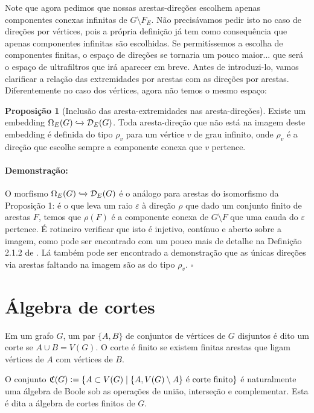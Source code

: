 \documentclass[11pt]{article}
\renewcommand{\textit}[1]{{\fakeitalic#1}}
\newcommand{\defeq}{\vcentcolon=}
\newcommand{\pulinho}{\vspace{.5cm}}
\theoremstyle{definition}
\theoremstyle{definition}
\theoremstyle{definition}
\newtheorem{prop}{Proposição}
\newenvironment{proposicao}{
\definecolor{shadecolor}{HTML}{FFDBDF}
\begin{shaded}
\begin{prop}
}
{
\end{prop}
\end{shaded}
}
\theoremstyle{definition}
\theoremstyle{definition}
\theoremstyle{definition}
\theoremstyle{definition}
\theoremstyle{definition}
\newtheorem*{definition*}{Definição}
\newenvironment{definicao*}{
\definecolor{shadecolor}{HTML}{defcfc}
\begin{shaded}
\begin{definition*}
}
{
\end{definition*}
\end{shaded}
}
\theoremstyle{definition}
\theoremstyle{definition}
\theoremstyle{definition}
\theoremstyle{definition}
\newenvironment{prova}{\paragraph{Demonstração:}}{\hfill$\square$ 
\pulinho
}
\begin{document}
Note que agora pedimos que nossas arestas-direções escolhem apenas componentes conexas infinitas de $G \setminus F_E$. Não precisávamos pedir isto no caso de direções por vértices, pois a própria definição já tem como consequência que apenas componentes infinitas são escolhidas. Se permitíssemos a escolha de componentes finitas, o espaço de direções se tornaria um pouco maior... que será o espaço de ultrafiltros que irá aparecer em breve. Antes de introduzi-lo, vamos clarificar a relação das extremidades por arestas com as direções por arestas. Diferentemente no caso dos vértices, agora não temos o mesmo espaço:

\begin{proposicao}[Inclusão das aresta-extremidades nas aresta-direções]
Existe um embedding $\Omega_E(G) \xhookrightarrow{} \mathcal{D}_E(G)$. Toda aresta-direção que não está na imagem deste embedding é definida do tipo $\rho_v$ para um vértice $v$ de grau infinito, onde $\rho_v$ é a direção que escolhe sempre a componente conexa que $v$ pertence.
\end{proposicao}
\begin{prova}
    O morfismo $\Omega_E(G) \xhookrightarrow{} \mathcal{D}_E(G)$ é o análogo para arestas do isomorfismo da Proposição 1: é o que leva um raio $\varepsilon$ à direção $\rho$ que dado um conjunto finito de arestas $F$, temos que $\rho(F)$ é a componente conexa de $G \setminus F$ que uma cauda do $\varepsilon$ pertence. É rotineiro verificar que isto é injetivo, contínuo e aberto sobre a imagem, como pode ser encontrado com um pouco mais de detalhe na Definição 2.1.2 de \cite{meninos2025}. Lá também pode ser encontrado a demonstração que as únicas direções via arestas faltando na imagem são as do tipo $\rho_v$.
\end{prova}

\pulinho

\section{Álgebra de cortes}

\begin{definicao*}
Em um grafo $G$, um par  $\{A,B\}$ de conjuntos de vértices de $G$ disjuntos é dito um \textit{corte} se $A \cup B = V(G)$. O corte é \textit{finito} se existem finitas arestas que ligam vértices de $A$ com vértices de $B$.

\pulinho

O conjunto $\mathfrak{C}(G) \defeq \{A \subset V(G) \mid \{A, V(G) \setminus A\} \text{ é corte finito}\}$ é naturalmente uma álgebra de Boole sob as operações de união, interseção e complementar. Esta é dita a \textit{álgebra de cortes finitos} de $G$.
\end{definicao*}
\end{document}
